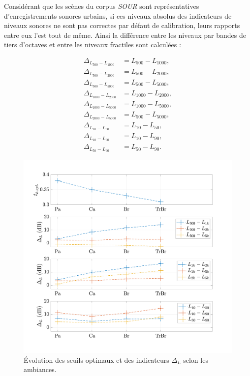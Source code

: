 Considérant que les scènes du corpus \textit{SOUR} sont représentatives d'enregistrements sonores urbains, si ces niveaux absolus des indicateurs de niveaux sonores ne sont pas correctes par défaut de calibration, leurs rapports entre eux l'est tout de même.
Ainsi la différence entre les niveaux par bandes de tiers d'octaves et entre les niveaux fractiles sont calculées : 

\begin{subequations}\label{eq:delta_L}
\begin{align}
\Delta_{L_{500}-L_{1000}} &= L_{500}-L_{1000}, \\
\Delta_{L_{500}-L_{2000}} &= L_{500}-L_{2000}, \\
\Delta_{L_{500}-L_{5000}} &= L_{500}-L_{5000}, \\
\Delta_{L_{1000}-L_{2000}} &= L_{1000}-L_{2000}, \\
\Delta_{L_{1000}-L_{5000}} &= L_{1000}-L_{5000}, \\
\Delta_{L_{2000}-L_{5000}} &= L_{500}-L_{5000}, \\
\Delta_{L_{10}-L_{50}} &= L_{10}-L_{50}, \\
\Delta_{L_{10}-L_{90}} &= L_{10}-L_{90}, \\
\Delta_{L_{50}-L_{90}} &= L_{50}-L_{90}.
\end{align}
\end{subequations}

\begin{figure}[h]
\centering
\includegraphics[width=0.9\linewidth]{./figures/resultats/deltaL_opt.pdf}
\caption{Évolution des seuils optimaux et des indicateurs $\Delta_L$ selon les ambiances.}
\label{fig:delta_L}
\end{figure}


